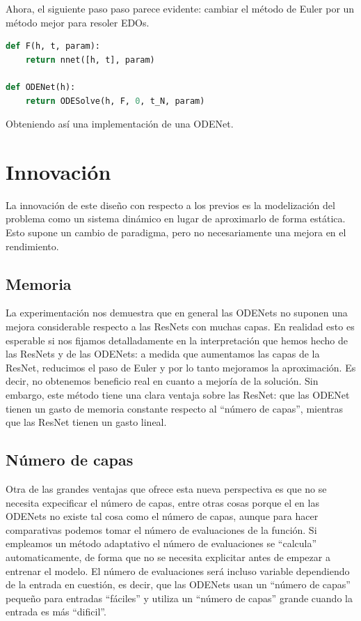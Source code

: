 \documentclass[12pt]{report}
\begin{document}
Ahora, el siguiente paso paso parece evidente: cambiar el método de Euler por un
método mejor para resoler EDOs.
\begin{lstlisting}[language=Python]
def F(h, t, param):
    return nnet([h, t], param)

def ODENet(h):
    return ODESolve(h, F, 0, t_N, param)
\end{lstlisting}
Obteniendo así una implementación de una ODENet.

\chapter{Innovación}\label{sec:inno}

La innovación de este diseño con respecto a los previos es la modelización del
problema como un sistema dinámico en lugar de aproximarlo de forma estática.
Esto supone un cambio de paradigma, pero no necesariamente una mejora en el
rendimiento. 

\section{Memoria}
La experimentación nos demuestra que en general las ODENets no suponen una
mejora considerable respecto a las ResNets con muchas capas. En realidad esto es
esperable si nos fijamos detalladamente en la interpretación que hemos hecho de
las ResNets y de las ODENets: a medida que aumentamos las capas de la ResNet,
reducimos el paso de Euler y por lo tanto mejoramos la aproximación. Es decir,
no obtenemos beneficio real en cuanto a mejoría de la solución. Sin embargo,
este método tiene una clara ventaja sobre las ResNet: que las ODENet tienen un
gasto de memoria constante respecto al ``número de capas'', mientras que las
ResNet tienen un gasto lineal.

\section{Número de capas}
Otra de las grandes ventajas que ofrece esta nueva perspectiva es que no se
necesita expecificar el número de capas, entre otras cosas porque el en las
ODENets no existe tal cosa como el número de capas, aunque para hacer
comparativas podemos tomar el número de evaluaciones de la función. Si empleamos
un método adaptativo el número de evaluaciones se ``calcula'' automaticamente,
de forma que no se necesita explicitar antes de empezar a entrenar el modelo.
El número de evaluaciones será incluso variable dependiendo de la entrada en
cuestión, es decir, que las ODENets usan un ``número de capas'' pequeño para
entradas ``fáciles'' y utiliza un ``número de capas'' grande cuando la entrada
es más ``dificil''.
\end{document}
